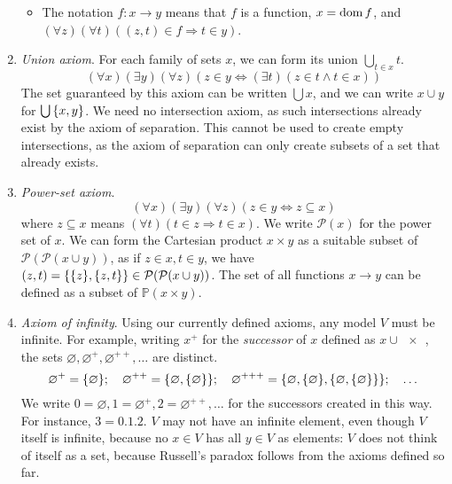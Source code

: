 \begin{enumerate}
\begin{itemize}
        \item The notation \( f \colon x \to y \) means that \( f \) is a function, \( x = \operatorname{dom} f \), and \( (\forall z)(\forall t)((z, t) \in f \Rightarrow t \in y) \).
    \end{itemize}
    \item \emph{Union axiom}.
    For each family of sets \( x \), we can form its union \( \bigcup_{t \in x} t \).
    \[ (\forall x)(\exists y)(\forall z)(z \in y \Leftrightarrow (\exists t)(z \in t \wedge t \in x)) \]
    The set guaranteed by this axiom can be written \( \bigcup x \), and we can write \( x \cup y \) for \( \bigcup \qty{x, y} \).
    We need no intersection axiom, as such intersections already exist by the axiom of separation.
    This cannot be used to create empty intersections, as the axiom of separation can only create subsets of a set that already exists.
    \item \emph{Power-set axiom}.
    \[ (\forall x)(\exists y)(\forall z)(z \in y \Leftrightarrow z \subseteq x) \]
    where \( z \subseteq x \) means \( (\forall t)(t \in z \Rightarrow t \in x) \).
    We write \( \mathcal P(x) \) for the power set of \( x \).
    We can form the Cartesian product \( x \times y \) as a suitable subset of \( \mathcal P(\mathcal P(x \cup y)) \), as if \( z \in x, t \in y \), we have \( (z, t) = \qty{\qty{z}, \qty{z, t}} \in \mathcal P(\mathcal P(x \cup y)) \).
    The set of all functions \( x \to y \) can be defined as a subset of \( \mathbb P(x \times y) \).
    \item \emph{Axiom of infinity}.
    Using our currently defined axioms, any model \( V \) must be infinite.
    For example, writing \( x^+ \) for the \emph{successor} of \( x \) defined as \( x \cup \qty{x} \), the sets \( \varnothing, \varnothing^+, \varnothing^{++}, \dots \) are distinct.
    \[ \varnothing^+ = \qty{\varnothing};\quad \varnothing^{++} = \qty{\varnothing, \qty{\varnothing}};\quad \varnothing^{+++} = \qty{\varnothing, \qty{\varnothing}, \qty{\varnothing, \qty{\varnothing}}};\quad \dots \]
    We write \( 0 = \varnothing, 1 = \varnothing^+, 2 = \varnothing^{++}, \dots \) for the successors created in this way.
    For instance, \( 3 = \qty{0, 1, 2} \).
    \( V \) may not have an infinite element, even though \( V \) itself is infinite, because no \( x \in V \) has all \( y \in V \) as elements: \( V \) does not think of itself as a set, because Russell's paradox follows from the axioms defined so far.


\end{enumerate}
